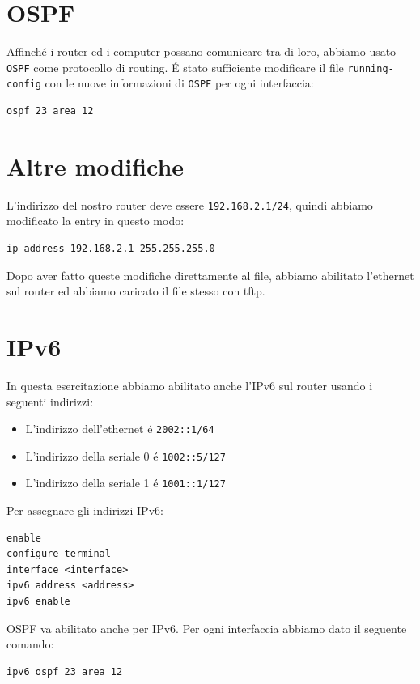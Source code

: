 \documentclass[9pt, a4paper, oneside]{article}
\begin{document}
		\section{OSPF}
			\par
				Affinch\'e i router ed i computer possano  
				comunicare tra di loro, abbiamo usato 
				\texttt{OSPF} come protocollo di routing. \'E 
				stato sufficiente modificare il file 
				\texttt{running-config} con le 
				nuove informazioni di \texttt{OSPF} per ogni 
				interfaccia:
				\begin{verbatim}
ospf 23 area 12
				\end{verbatim}
		\section{Altre modifiche}
			\par
				L'indirizzo del nostro router deve essere 
				\texttt{192.168.2.1/24}, quindi abbiamo 
				modificato la entry in questo modo:
				\begin{verbatim}
ip address 192.168.2.1 255.255.255.0
				\end{verbatim}
			\par
				Dopo aver fatto queste modifiche 
				direttamente al file, abbiamo abilitato 
				l'ethernet sul router ed abbiamo caricato il 
				file stesso con tftp.
		\section{IPv6}
			\par
				In questa esercitazione abbiamo abilitato anche 
				l'IPv6 sul router usando i seguenti indirizzi:
				\begin{itemize}
					\item
						L'indirizzo 
						dell'ethernet \'e 
						\texttt{2002::1/64}
					\item
						L'indirizzo della seriale 0 \'e 
						\texttt{1002::5/127}
					\item
						L'indirizzo della seriale 1 \'e 
						\texttt{1001::1/127}
				\end{itemize}
				Per assegnare gli indirizzi IPv6:
				\begin{verbatim}
enable
configure terminal
interface <interface>
ipv6 address <address>
ipv6 enable
				\end{verbatim}
				OSPF va abilitato anche per IPv6. Per ogni 
				interfaccia abbiamo dato il seguente comando:
				\begin{verbatim}
ipv6 ospf 23 area 12				
				\end{verbatim}
		\newpage
\end{document}
